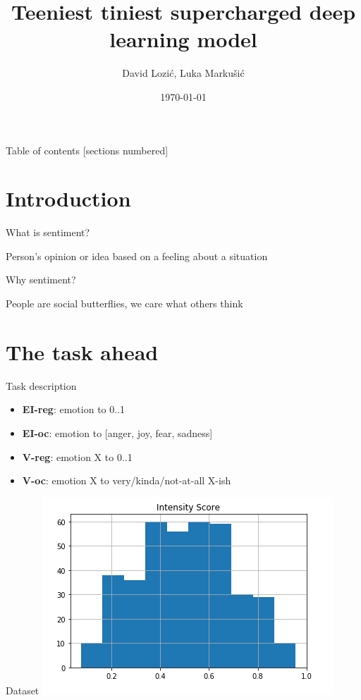 \documentclass[10pt, utf8]{beamer}
\title{Teeniest tiniest supercharged deep learning model}
\date{\today}
\author{David Lozić, Luka Markušić}
\institute{Faculty of Electrical Engineering and Computing}
\begin{document}
\maketitle

\begin{frame}{Table of contents}
  [sections numbered]
  \tableofcontents[hideallsubsections]
\end{frame}

\section{Introduction}

\begin{frame}[fragile]{What is sentiment?}

    Person's opinion or idea based on a feeling about a situation
\end{frame}

\begin{frame}[fragile]{Why sentiment?}

    People are social butterflies, we care what others think
\end{frame}

\section{The task ahead} 
\begin{frame}{Task description}
    \begin{itemize}
        \item \textbf{EI-reg}: emotion to 0..1 \\
        \item \textbf{EI-oc}: emotion to [anger, joy, fear, sadness]
        \item \textbf{V-reg}: emotion X to 0..1 \\
        \item \textbf{V-oc}: emotion X to very/kinda/not-at-all X-ish \\
    \end{itemize}
\end{frame}

\begin{frame}{Dataset}
    \includegraphics[width=\textwidth]{data_distrib.png}
\end{frame}
\end{document}
